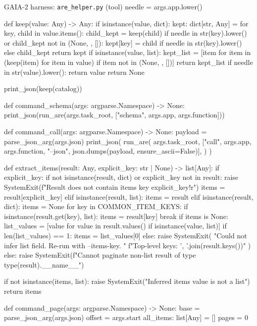 \begin{promptbox}{GAIA-2 harness: \texttt{are\_helper.py} (tool)}
    needle = args.app.lower()

    def keep(value: Any) -> Any:
        if isinstance(value, dict):
            kept: dict[str, Any] = {}
            for key, child in value.items():
                child_kept = keep(child)
                if needle in str(key).lower() or child_kept not in (None, {}, []):
                    kept[key] = child if needle in str(key).lower() else child_kept
            return kept
        if isinstance(value, list):
            kept_list = [item for item in (keep(item) for item in value) if item not in (None, {}, [])]
            return kept_list
        if needle in str(value).lower():
            return value
        return None

    print_json(keep(catalog))


def command_schema(args: argparse.Namespace) -> None:
    print_json(run_are(args.task_root, ["schema", args.app, args.function]))


def command_call(args: argparse.Namespace) -> None:
    payload = parse_json_arg(args.json)
    print_json(
        run_are(
            args.task_root,
            ["call", args.app, args.function, "--json", json.dumps(payload, ensure_ascii=False)],
        )
    )


def extract_items(result: Any, explicit_key: str | None) -> list[Any]:
    if explicit_key:
        if not isinstance(result, dict) or explicit_key not in result:
            raise SystemExit(f"Result does not contain items key {explicit_key!r}")
        items = result[explicit_key]
    elif isinstance(result, list):
        items = result
    elif isinstance(result, dict):
        items = None
        for key in COMMON_ITEM_KEYS:
            if isinstance(result.get(key), list):
                items = result[key]
                break
        if items is None:
            list_values = [value for value in result.values() if isinstance(value, list)]
            if len(list_values) == 1:
                items = list_values[0]
            else:
                raise SystemExit(
                    "Could not infer list field. Re-run with --items-key. "
                    f"Top-level keys: {', '.join(result.keys())}"
                )
    else:
        raise SystemExit(f"Cannot paginate non-list result of type {type(result).__name__}")

    if not isinstance(items, list):
        raise SystemExit("Inferred items value is not a list")
    return items


def command_page(args: argparse.Namespace) -> None:
    base = parse_json_arg(args.json)
    offset = args.start
    all_items: list[Any] = []
    pages = 0


\end{promptbox}
